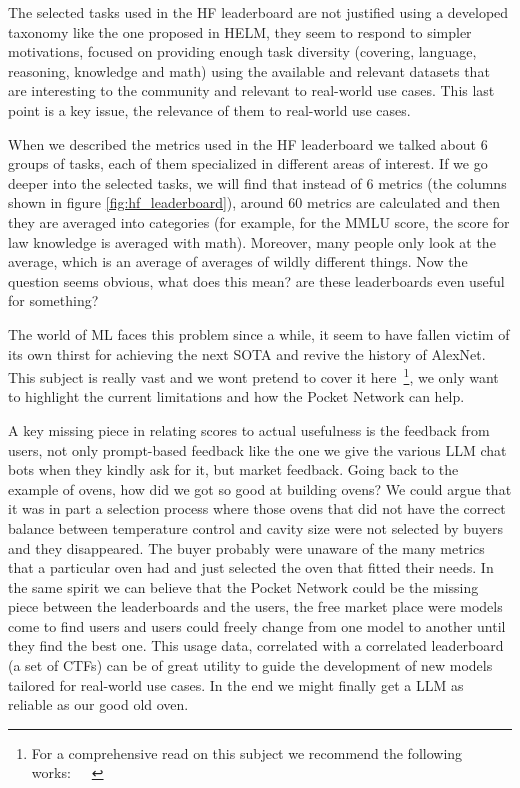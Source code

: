 The selected tasks used in the \gls{HF} leaderboard are not justified using a developed taxonomy like the one proposed in \gls{HELM}, they seem to respond to simpler motivations, focused on providing enough task diversity (covering, language, reasoning, knowledge and math) using the available and relevant datasets that are interesting to the community and relevant to real-world use cases. This last point is a key issue, the relevance of them to real-world use cases.

When we described the metrics used in the \gls{HF} leaderboard we talked about 6 groups of tasks, each of them specialized in different areas of interest. If we go deeper into the selected tasks, we will find that instead of 6 metrics (the columns shown in figure \ref{fig:hf_leaderboard}), around 60 metrics are calculated and then they are averaged into categories (for example, for the MMLU score, the score for law knowledge is averaged with math). Moreover, many people only look at the average, which is an average of averages of wildly different things. 
Now the question seems obvious, what does this mean? are these leaderboards even useful for something?

The world of \gls{ML} faces this problem since a while, it seem to have fallen victim of its own thirst for achieving the next \gls{SOTA} and revive the history of AlexNet. This subject is really vast and we wont pretend to cover it here~\footnote{For a comprehensive read on this subject we recommend the following works:~\cite{nityasya2023scientific}~\cite{chollet2019measure}~\cite{raji2021ai}}, we only want to highlight the current limitations and how the Pocket Network can help.

A key missing piece in relating scores to actual usefulness is the feedback from users, not only prompt-based feedback like the one we give the various \gls{LLM} chat bots when they kindly ask for it, but market feedback. Going back to the example of ovens, how did we got so good at building ovens? We could argue that it was in part a selection process where those ovens that did not have the correct balance between temperature control and cavity size were not selected by buyers and they disappeared. The buyer probably were unaware of the many metrics that a particular oven had and just selected the oven that fitted their needs. In the same spirit we can believe that the Pocket Network could be the missing piece between the leaderboards and the users, the free market place were models come to find users and users could freely change from one model to another until they find the best one. This usage data, correlated with a correlated leaderboard (a set of \glspl{CTF}) can be of great utility to guide the development of new models tailored for real-world use cases. In the end we might finally get a \gls{LLM} as reliable as our good old oven.